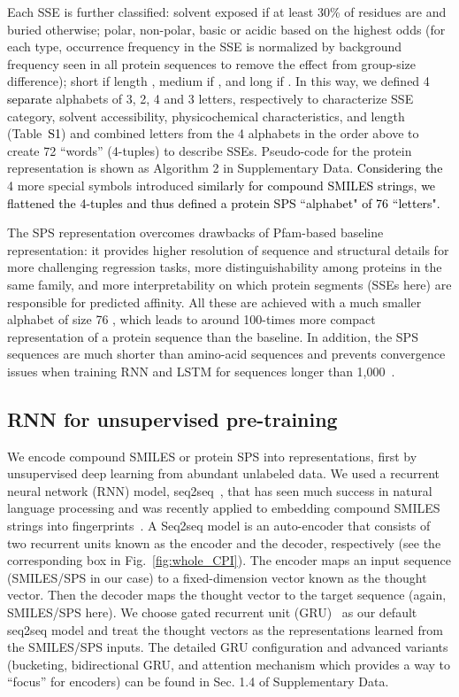 \documentclass[nocrop]{bioinfo}
\newcommand{\red}[1]{\textcolor{black}{#1}}
\begin{document}
Each SSE is further classified: solvent exposed if at least 30\% of residues are and buried otherwise; polar, non-polar, basic or acidic based on the highest odds  (for each type, occurrence frequency in the SSE is normalized by background frequency seen in all protein sequences to remove the effect from group-size difference); short if length , medium if , and long if .  In this way, we defined 4 \red{separate} alphabets of 3, 2, 4 and 3 letters, respectively to characterize SSE category, solvent accessibility, physicochemical characteristics, and length  (Table~\red{S1}) and combined letters from the 4 alphabets in the order above to create 72 ``words''  (4-tuples) to describe SSEs. 
Pseudo-code for the protein representation is shown as Algorithm 2 in Supplementary Data. \red{Considering the} 4 more special symbols introduced \red{similarly for compound SMILES strings, we flattened the 4-tuples and thus defined a protein SPS ``alphabet" of 76 ``letters".}

The SPS representation overcomes drawbacks of Pfam-based baseline representation: it provides higher resolution of sequence and structural details for more challenging regression tasks, more distinguishability among proteins in the same family, and more interpretability on which protein segments  (SSEs here) are responsible for predicted affinity.  All these are achieved with a much smaller alphabet of size 76
, which leads to around 100-times more compact representation of a protein sequence than the baseline. 
In addition, the SPS sequences are much shorter than amino-acid sequences and prevents convergence issues when training RNN and LSTM for sequences longer than 1,000~\citep{IndRNN}.


\vspace{-1em}
\subsection{RNN for unsupervised pre-training}



We encode compound SMILES or protein SPS into representations, first by unsupervised deep learning from abundant unlabeled data. We used a recurrent neural network  (RNN) model, seq2seq~\citep{sutskever2014sequence}, that has seen much success in natural language processing and was recently applied to embedding compound SMILES strings into fingerprints~\citep{xu2017seq2seq}. 
A Seq2seq model is an auto-encoder that consists of two recurrent units known as the encoder and the decoder, respectively  (see the corresponding box in Fig.~\ref{fig:whole_CPI}). 
The encoder maps an input sequence   (SMILES/SPS in our case) to a fixed-dimension vector known as the thought vector. Then the decoder maps the thought vector to the target sequence  (again, SMILES/SPS here). We choose gated recurrent unit  (GRU)~\citep{cho2014properties} as our default seq2seq model and treat the thought vectors as the representations learned from the SMILES/SPS inputs. The detailed GRU configuration and advanced variants  (bucketing, bidirectional GRU, and  attention mechanism which provides a way to ``focus'' for encoders) can be found in Sec. 1.4 of Supplementary Data.
\end{document}
